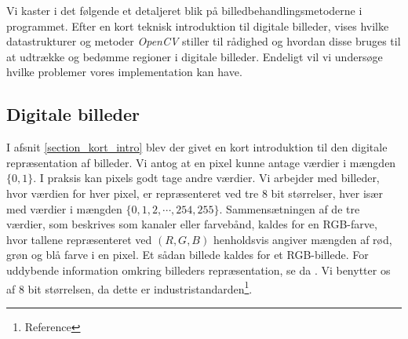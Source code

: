 {
{\sffamily Vi kaster i det følgende et detaljeret blik på
billedbehandlingsmetoderne i programmet. Efter en kort teknisk
introduktion til digitale billeder, vises hvilke datastrukturer og
metoder \emph{OpenCV} stiller til rådighed og hvordan disse bruges til
at udtrække og bedømme regioner i digitale billeder. Endeligt vil vi
undersøge hvilke problemer vores implementation kan have.
}

\subsection{Digitale billeder}
I afsnit \ref{section_kort_intro} blev der givet en kort introduktion
til den digitale repræsentation af billeder. Vi antog at en pixel kunne
antage værdier i mængden $\{0, 1\}$. I praksis kan pixels godt tage
andre værdier. Vi arbejder med billeder, hvor værdien for hver pixel, er
repræsenteret ved tre 8 bit størrelser, hver især med værdier i mængden
$\{0, 1, 2, \cdots, 254, 255\}$. Sammensætningen af de tre værdier, som
beskrives som kanaler eller farvebånd, kaldes for en RGB-farve, hvor
tallene repræsenteret ved $(R,G,B)$ henholdsvis angiver mængden af rød,
grøn og blå farve i en pixel. Et sådan billede kaldes for et
RGB-billede. For uddybende information omkring billeders repræsentation,
se da \cite{SIOlsen}. Vi benytter os af 8 bit størrelsen, da dette er
industristandarden\footnote{Reference}.

}

